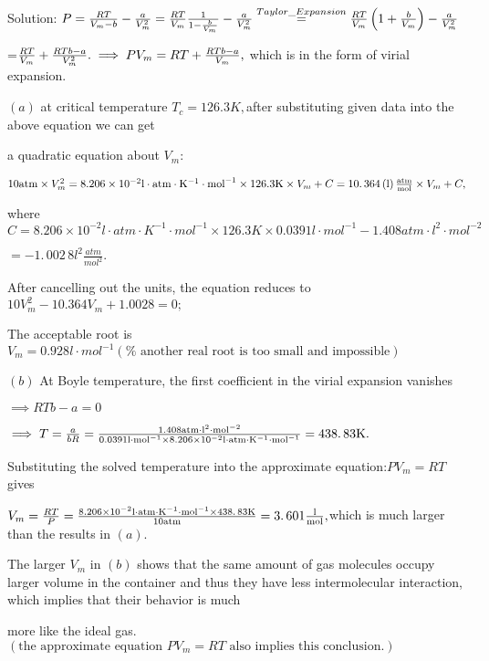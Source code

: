 \documentclass{ctexart}
\begin{document}
Solution: $P=\frac{RT}{V_{m}-b}-\frac{a}{V_{m}^{2}}=\frac{RT}{V_{m}}\frac{1}{%
1-\frac{b}{V_{m}}}-\frac{a}{V_{m}^{2}}\overset{Taylor\_Expansion}{=}\frac{RT%
}{V_{m}}\left( 1+\frac{b}{V_{m}}\right) -\frac{a}{V_{m}^{2}}$

=$\frac{RT}{V_{m}}+\frac{RTb-a}{V_{m}^{2}}.\implies PV_{m}=RT+\frac{RTb-a}{%
V_{m}},$ which is in the form of virial expansion.

$\left( a\right) $ at critical temperature $T_{c}=126.3\unit{K},$after
substituting given data into the above equation we can get

a quadratic equation about $V_{m}:$

$10\unit{atm}\times V_{m}^{2}=8.206\times 10^{-2}\unit{l}\cdot \unit{atm}%
\cdot \unit{K}^{-1}\cdot \unit{mol}^{-1}\times 126.3\unit{K}\times
V_{m}+C=\allowbreak 10.\,\allowbreak 364\left( \unit{l}\right) \frac{\unit{%
atm}}{\unit{mol}}\times V_{m}+C,$

where $C=8.206\times 10^{-2}\unit{l}\cdot \unit{atm}\cdot \unit{K}^{-1}\cdot 
\unit{mol}^{-1}\times 126.3\unit{K}\times 0.0391\unit{l}\cdot \unit{mol}%
^{-1}-1.408\unit{atm}\cdot \unit{l}^{2}\cdot \unit{mol}^{-2}$

$=-1.\,\allowbreak 002\,8\unit{l}^{2}\frac{\unit{atm}}{\unit{mol}^{2}}.$

After cancelling out the units, the equation reduces to $%
10V_{m}^{2}-10.364V_{m}+1.0028=0;$

The acceptable root is $V_{m}=0.928\unit{l}\cdot \unit{mol}^{-1}\left( \text{%
another real root is too small and impossible}\right) $

$\left( b\right) $ At Boyle temperature, the first coefficient in the virial
expansion vanishes

$\implies RTb-a=0$

$\implies T=\frac{a}{bR}=\frac{1.408\unit{atm}\cdot \unit{l}^{2}\cdot \unit{%
mol}^{-2}}{0.0391\unit{l}\cdot \unit{mol}^{-1}\times 8.206\times 10^{-2}%
\unit{l}\cdot \unit{atm}\cdot \unit{K}^{-1}\cdot \unit{mol}^{-1}}%
=\allowbreak 438.\,\allowbreak 83\unit{K}.$

Substituting the solved temperature into the approximate equation:$PV_{m}=RT$
gives

$V_{m}=\frac{RT}{P}=\frac{8.206\times 10^{-2}\unit{l}\cdot \unit{atm}\cdot 
\unit{K}^{-1}\cdot \unit{mol}^{-1}\times \allowbreak 438.\,\allowbreak 83%
\unit{K}}{10\unit{atm}}=\allowbreak 3.\,\allowbreak 601\frac{\unit{l}}{\unit{%
mol}},$which is much larger than the results in $\left( a\right) .$

The larger $V_{m}$ in $\left( b\right) $ shows that the same amount of gas
molecules occupy larger volume in the container and thus they have less
intermolecular interaction, which implies that their behavior is much

more like the ideal gas. $\left( \text{the approximate equation }PV_{m}=RT%
\text{ also implies this conclusion.}\right) $
\end{document}

